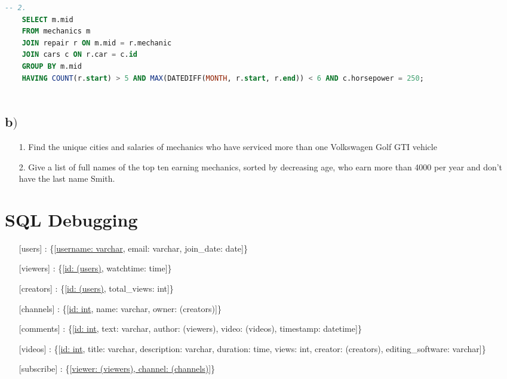 \begin{lstlisting}[language=SQL]
	-- 2.
	SELECT m.mid 
	FROM mechanics m
	JOIN repair r ON m.mid = r.mechanic
	JOIN cars c ON r.car = c.id
	GROUP BY m.mid
	HAVING COUNT(r.start) > 5 AND MAX(DATEDIFF(MONTH, r.start, r.end)) < 6 AND c.horsepower = 250;  
	
\end{lstlisting}

\subsection{b$)$}

\begin{itemize}
	\item[1.] Find the unique cities and salaries of mechanics who have serviced more than one Volkswagen Golf GTI vehicle
	\item[2.] Give a list of full names of the top ten earning mechanics, sorted by decreasing age, who earn more than 4000 per year and don’t have the last name Smith.
\end{itemize}
	
\section{SQL Debugging}

\begin{itemize}
	\item[] [users] : \{[\underline{username: varchar}, email: varchar, join\_date: date]\}
	\item[] [viewers] : \{[\underline{id: (users)}, watchtime: time]\}
	\item[] [creators] : \{[\underline{id: (users)}, total\_views: int]\}
	\item[] [channels] : \{[\underline{id: int}, name: varchar, owner: (creators)]\}
	\item[] [comments] : \{[\underline{id: int}, text: varchar, author: (viewers), video: (videos), timestamp: datetime]\}
	\item[] [videos] : \{[\underline{id: int}, title: varchar, description: varchar, duration: time, views: int, creator: (creators), editing\_software: varchar]\}
	\item[] [subscribe] : \{[\underline{viewer: (viewers), channel: (channels)}]\}
\end{itemize}

